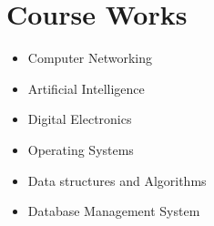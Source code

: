 \documentclass[letterpaper,11pt]{article}
\newcommand{\resumeItem}[1]{
  \item\small{
    {#1 \vspace{-2pt}}
  }
}
\newcommand{\resumeItemListStart}{\begin{itemize}}
\newcommand{\resumeItemListEnd}{\end{itemize}\vspace{-5pt}}
\begin{document}
\section{Course Works }
\begin{multicols}{2}
 \begin{itemize}[leftmargin=0.15in, label={}]
    \resumeItemListStart
        \resumeItem{Computer Networking}
        \resumeItem{Artificial Intelligence}
        \resumeItem{Digital Electronics}
        \resumeItem{Operating Systems}
        \resumeItem{Data structures and Algorithms}
        \resumeItem{Database Management System}
      \resumeItemListEnd
 \end{itemize}
 \end{multicols}
 \vspace{-16pt}
 
\end{document}
